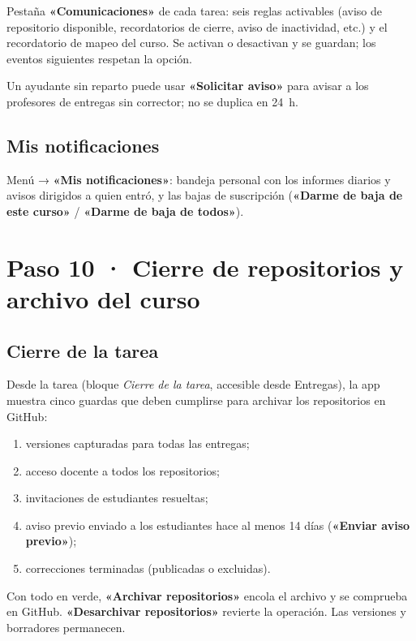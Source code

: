 \documentclass[11pt,a4paper]{article}
\newcommand{\ui}[1]{\textbf{«#1»}}        %
\begin{document}
Pestaña \ui{Comunicaciones} de cada tarea: seis reglas activables (aviso de repositorio disponible, recordatorios de cierre, aviso de inactividad, etc.) y el recordatorio de mapeo del curso. Se activan o desactivan y se guardan; los eventos siguientes respetan la opción.

Un ayudante sin reparto puede usar \ui{Solicitar aviso} para avisar a los profesores de entregas sin corrector; no se duplica en 24~h.

\subsection{Mis notificaciones}

Menú → \ui{Mis notificaciones}: bandeja personal con los informes diarios y avisos dirigidos a quien entró, y las bajas de suscripción (\ui{Darme de baja de este curso} / \ui{Darme de baja de todos}).

\section{Paso 10 · Cierre de repositorios y archivo del curso}
\label{sec:cierre}

\subsection{Cierre de la tarea}

Desde la tarea (bloque \emph{Cierre de la tarea}, accesible desde Entregas), la app muestra cinco guardas que deben cumplirse para archivar los repositorios en GitHub:

\begin{enumerate}
  \item versiones capturadas para todas las entregas;
  \item acceso docente a todos los repositorios;
  \item invitaciones de estudiantes resueltas;
  \item aviso previo enviado a los estudiantes hace al menos 14 días (\ui{Enviar aviso previo});
  \item correcciones terminadas (publicadas o excluidas).
\end{enumerate}

Con todo en verde, \ui{Archivar repositorios} encola el archivo y se comprueba en GitHub. \ui{Desarchivar repositorios} revierte la operación. Las versiones y borradores permanecen.
\end{document}
